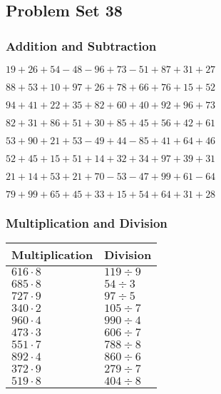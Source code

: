 \hypertarget{problem-set-38}{%
\subsection{Problem Set 38}\label{problem-set-38}}

\hypertarget{addition-and-subtraction}{%
\subsubsection{Addition and
Subtraction}\label{addition-and-subtraction}}

\(19+26+54-48-96+73-51+87+31+27\)

\(88+53+10+97+26+78+66+76+15+52\)

\(94+41+22+35+82+60+40+92+96+73\)

\(82+31+86+51+30+85+45+56+42+61\)

\(53+90+21+53-49+44-85+41+64+46\)

\(52+45+15+51+14+32+34+97+39+31\)

\(21+14+53+21+70-53-47+99+61-64\)

\(79+99+65+45+33+15+54+64+31+28\)

\hypertarget{multiplication-and-division}{%
\subsubsection{Multiplication and
Division}\label{multiplication-and-division}}

\begin{longtable}[]{@{}ll@{}}
\toprule
Multiplication & Division\tabularnewline
\midrule
\endhead
\(616\cdot8\) & \(119÷9\)\tabularnewline
\(685\cdot8\) & \(54÷3\)\tabularnewline
\(727\cdot9\) & \(97÷5\)\tabularnewline
\(340\cdot2\) & \(105÷7\)\tabularnewline
\(960\cdot4\) & \(990÷4\)\tabularnewline
\(473\cdot3\) & \(606÷7\)\tabularnewline
\(551\cdot7\) & \(788÷8\)\tabularnewline
\(892\cdot4\) & \(860÷6\)\tabularnewline
\(372\cdot9\) & \(279÷7\)\tabularnewline
\(519\cdot8\) & \(404÷8\)\tabularnewline
\bottomrule
\end{longtable}
